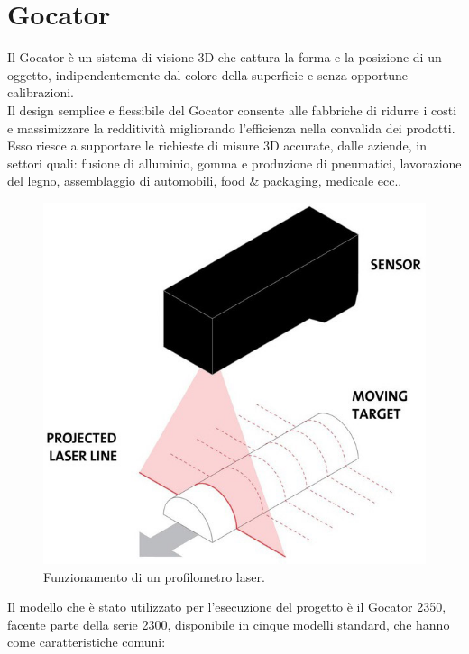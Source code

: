 \chapter{Gocator}
\label{Cha:gocator}
\thispagestyle{empty}

Il Gocator è un sistema di visione 3D che cattura la forma e la posizione di un oggetto, indipendentemente dal colore della superficie e senza opportune calibrazioni.\\
\newline
Il design semplice e flessibile del Gocator consente alle fabbriche di ridurre i costi e massimizzare la redditività migliorando l'efficienza nella convalida dei prodotti. Esso riesce a supportare le richieste di misure 3D accurate, dalle aziende, in settori quali: fusione di alluminio, gomma e produzione di pneumatici, lavorazione del legno, assemblaggio di automobili, food \& packaging, medicale ecc..\\

\begin{figure}[H]
	\centering
	\includegraphics[scale=0.30]{./pictures/gocator_1.jpg}
	\caption{Funzionamento di un profilometro laser.}\label{fig:gocator_1}
\end{figure}

\noindent Il modello che è stato utilizzato per l'esecuzione del progetto è il Gocator 2350, facente parte della serie 2300, disponibile in cinque modelli standard, che hanno come caratteristiche comuni:

